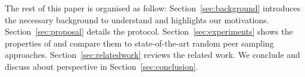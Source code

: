 The rest of this paper is organised as follow: Section~\ref{sec:background}
introduces the necessary background to understand \SCAMPLON{} and highlights
our motivations. Section~\ref{sec:proposal} details the \SCAMPLON{} protocol.
Section~\ref{sec:experiments} shows the properties of \SCAMPLON{} and compare
them to state-of-the-art random peer sampling
approaches. Section~\ref{sec:relatedwork} reviews the related work. We conclude
and discuss about perspective in Section~\ref{sec:conclusion}.

